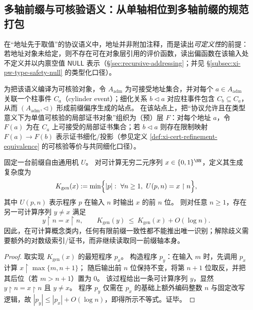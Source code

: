 \subsection{多轴前缀与可核验语义：从单轴相位到多轴前缀的规范打包}\label{subsec:cdim-three-axis-address}
在“地址先于取值”的协议语义中，地址并非附加注释，而是读出\emph{可定义性}的前提：若地址对象未给定，则不存在可在对象层引用的评价函数，读出偏函数在该输入处不定义并以内禀空值 \(\mathsf{NULL}\) 表示（\S\ref{sec:recursive-addressing}；并见 \S\ref{subsec:xi-pw-type-safety-null} 的类型化口径）。
\par
为把该语义编译为可核验对象，令 \(A_{\mathrm{adm}}\) 为可接受地址集合，并对每个 \(a\in A_{\mathrm{adm}}\) 关联一个柱事件 \(C_a\)（cylinder event）；细化关系 \(b\lhd a\) 对应柱事件包含 \(C_b\subseteq C_a\)，从而 \((A_{\mathrm{adm}},\lhd)\) 形成前缀偏序生成的站点。
在该站点上，把“协议允许且在类型意义下为单值可核验的局部证书对象”组织为（预）层 \(F\)：对每个地址 \(a\)，令 \(F(a)\) 为在 \(C_a\) 上可接受的局部证书集合；若 \(b\lhd a\) 则存在限制映射 \(F(a)\to F(b)\) 表示证书细化/投影（参见定义 \ref{def:xi-cert-refinement-equivalence} 的可核验等价与共同细化口径）。

\begin{theorem}\label{thm:cdim-computable-prefix-nonidentifiability}
固定一台前缀自由通用机 \(U\)。
对可计算无穷二元序列 \(x\in\{0,1\}^{\NN}\)，定义其生成复杂度为
\[
K_{\mathrm{gen}}(x):=\min\Bigl\{|p|:\ \forall n\ge 1,\ U(p,n)=x\upharpoonright n\Bigr\},
\]
其中 \(U(p,n)\) 表示程序 \(p\) 在输入 \(n\) 时输出 \(x\) 的前 \(n\) 位。
则对任意 \(n\ge 1\)，存在另一可计算序列 \(y\neq x\) 满足
\[
y\upharpoonright n=x\upharpoonright n,
\qquad
K_{\mathrm{gen}}(y)\ \le\ K_{\mathrm{gen}}(x)+O(\log n).
\]
因此，在可计算概念类内，任何有限前缀一致性都不能推出唯一识别；解除歧义需要额外的对数级索引/证书，而非继续读取同一前缀轴本身。
\end{theorem}
\begin{proof}
取实现 \(K_{\mathrm{gen}}(x)\) 的最短程序 \(p_x\)。
构造程序 \(p_y\)：在输入 \(m\) 时，先调用 \(p_x\) 计算 \(x\upharpoonright \max\{m,n+1\}\)；
随后输出前 \(n\) 位保持不变，将第 \(n+1\) 位取反，并把其后位（若 \(m>n+1\)）置为 \(0\)。
该过程给出一条可计算序列 \(y\)，显然 \(y\upharpoonright n=x\upharpoonright n\) 且 \(y\neq x\)。
程序 \(p_y\) 仅需在 \(p_x\) 的基础上额外编码整数 \(n\) 与固定改写逻辑，故
\(
|p_y|\le |p_x|+O(\log n)
\)，即得所示不等式。证毕。
\end{proof}

